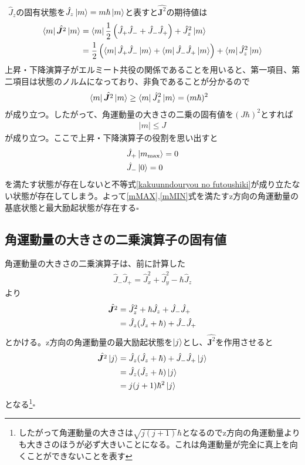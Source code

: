 \documentclass{jsarticle}  %
\numberwithin{equation}{section} %
\numberwithin{figure}{section}
\begin{document}
    $\ \ $$\hat{J}_z$の固有状態を$\hat{J}_z\ket{m} = m\hbar\ket{m}$と表すと$\hat{\bm{J}^2}$の期待値は
    \begin{align}
        \bra{m}\hat{\bm{J}^2}\ket{m} &= \bra{m}\frac{1}{2} \left( \hat{J}_+ \hat{J}_- + \hat{J}_- \hat{J}_+ \right) + \hat{J}_z^2\ket{m} \notag \\
        &= \frac{1}{2}\left( \bra{m} \hat{J}_+ \hat{J}_- \ket{m} + \bra{m} \hat{J}_- \hat{J}_+ \ket{m}\right) + \bra{m} \hat{J}_z^2 \ket{m}
    \end{align}
    上昇・下降演算子がエルミート共役の関係であることを用いると、第一項目、第二項目は状態のノルムになっており、非負であることが分かるので
    \begin{align}
        &\bra{m}\hat{\bm{J}^2}\ket{m}\ge  \bra{m} \hat{J}_z^2 \ket{m} = (m\hbar)^2
    \end{align}
    が成り立つ。したがって、角運動量の大きさの二乗の固有値を$(J\hbar)^2$とすれば
    \begin{align}
        |m|\le J \label{kakuunndouryou no
         futoushiki}
    \end{align}
    が成り立つ。ここで上昇・下降演算子の役割を思い出すと
    \begin{align}
        &\hat{J}_+ \ket{m_{\max}} = 0 \label{mMAX}\\
        &\hat{J}_- \ket{0} = 0 \label{mMIN}
    \end{align}
    を満たす状態が存在しないと不等式\eqref{kakuunndouryou no 
    futoushiki}が成り立たない状態が存在してしまう。よって\eqref{mMAX},\eqref{mMIN}式を満たすz方向の角運動量の基底状態と最大励起状態が存在する$\square$
\subsection{角運動量の大きさの二乗演算子の固有値}
    角運動量の大きさの二乗演算子は、前に計算した
    \begin{align}
        \hat{J}_- \hat{J}_+ = \hat{J}_x^2 + \hat{J}_y^2 - \hbar \hat{J}_z 
    \end{align}
    より
    \begin{align}
        \hat{\bm{J}^2} &= \hat{J}_z^2 + \hbar \hat{J}_z + \hat{J}_- \hat{J}_+ \notag \\
        &= \hat{J}_z (\hat{J}_z + \hbar) + \hat{J}_- \hat{J}_+
    \end{align}
    とかける。z方向の角運動量の最大励起状態を$\ket{j}$とし、$\hat{\bm{J}^2}$を作用させると
    \begin{align}
        \hat{\bm{J}^2}\ket{j} &= \hat{J}_z (\hat{J}_z + \hbar) + \hat{J}_- \hat{J}_+ \ket{j} \notag \\
        &= \hat{J}_z (\hat{J}_z + \hbar) \ket{j} \notag \\
        &= j(j + 1)\hbar^2\ket{j}
    \end{align}
    となる\footnote{したがって角運動量の大きさは$\sqrt{j(j+1)}\hbar $となるのでz方向の角運動量よりも大きさのほうが必ず大きいことになる。これは角運動量が完全に真上を向くことができないことを表す}$\square$
\end{document}

